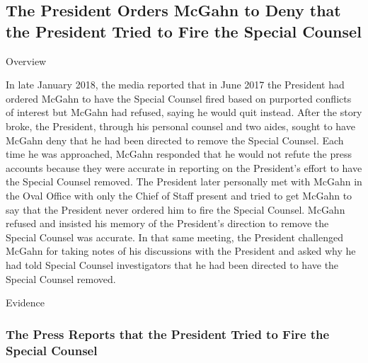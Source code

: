 {\subsection{The President Orders McGahn to Deny that the President Tried to Fire the Special Counsel}

Overview

In late January 2018, the media reported that in June 2017 the President had ordered McGahn to have the Special Counsel fired based on purported conflicts of interest but McGahn had refused, saying he would quit instead.
After the story broke, the President, through his personal counsel and two aides, sought to have McGahn deny that he had been directed to remove the Special Counsel.
Each time he was approached, McGahn responded that he would not refute the press accounts because they were accurate in reporting on the President's effort to have the Special Counsel removed.
The President later personally met with McGahn in the Oval Office with only the Chief of Staff present and tried to get McGahn to say that the President never ordered him to fire the Special Counsel.
McGahn refused and insisted his memory of the President's direction to remove the Special Counsel was accurate.
In that same meeting, the President challenged McGahn for taking notes of his discussions with the President and asked why he had told Special Counsel investigators that he had been directed to have the Special Counsel removed.

Evidence

\subsubsection{The Press Reports that the President Tried to Fire the Special Counsel}

}
